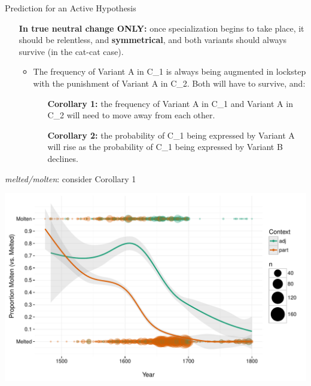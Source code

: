 \documentclass[hyperref={pdfpagelabels=false}]{beamer}
\begin{document}
\begin{frame}{Prediction for an Active Hypothesis}
		\begin{itemize}
			\item[] \textbf{In true neutral change ONLY:} once specialization begins to take place, it should be relentless, and \textbf{symmetrical}, and both variants should always survive (in the cat-cat case).
				\begin{itemize}
					\item The frequency of Variant A in C_1 is always being augmented in lockstep with the punishment of Variant A in C_2. Both will have to survive, and:
					\begin{itemize}
					\item[\textbf{Corollary 1:}] the frequency of Variant A in C_1 and Variant A in C_2 will need to move away from each other.
					\item[\textbf{Corollary 2:}] the probability of C_1 being expressed by Variant A will rise as the probability of C_1 being expressed by Variant B declines.
					\end{itemize}
				\end{itemize}
		\end{itemize}
\end{frame}

\begin{frame}{\textsl{melted/molten}: consider Corollary 1}

\includegraphics[width=1.128\textwidth]{FormByDateUnbinnedWithDots2.pdf}
\end{frame}

\end{document}
